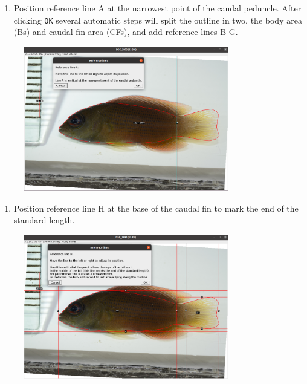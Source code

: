 \documentclass[
  letterpaper,
]{scrbook}
\providecommand{\tightlist}{%
  \setlength{\itemsep}{0pt}\setlength{\parskip}{0pt}}\usepackage{longtable,booktabs,array}
\begin{document}
\begin{enumerate}
\def\labelenumi{\arabic{enumi}.}
\setcounter{enumi}{4}
\tightlist
\item
  Position reference line A at the narrowest point of the caudal
  peduncle. After clicking \texttt{OK} several automatic steps will
  split the outline in two, the body area (Bs) and caudal fin area
  (CFs), and add reference lines B-G.
\end{enumerate}

\begin{figure}

{\centering \includegraphics[width=0.8\textwidth,height=\textheight]{./images/screenshots/ref_lineA.png}

}

\end{figure}

\begin{enumerate}
\def\labelenumi{\arabic{enumi}.}
\setcounter{enumi}{5}
\tightlist
\item
  Position reference line H at the base of the caudal fin to mark the
  end of the standard length.
\end{enumerate}

\begin{figure}

{\centering \includegraphics[width=0.8\textwidth,height=\textheight]{./images/screenshots/ref_lineH.png}

}

\end{figure}
\end{document}
